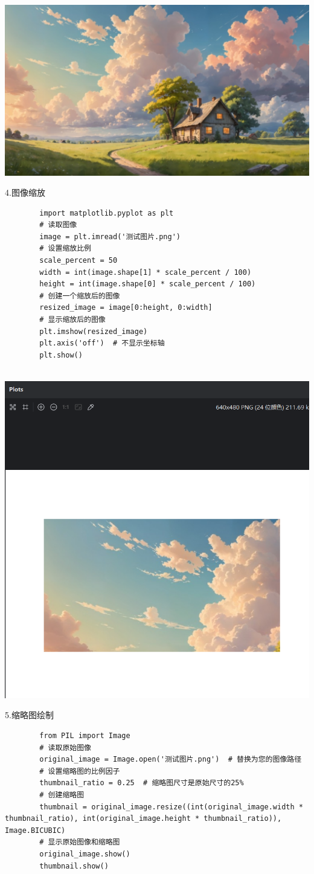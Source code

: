 \documentclass{article}
\begin{document}
	\noindent
	\begin{minipage}{\linewidth}
		\centering
		\includegraphics[width=0.5\linewidth]{mohu.png}
		\label{fig:example}
	\end{minipage}
	
	4.图像缩放
	\begin{verbatim}
		import matplotlib.pyplot as plt
		# 读取图像
		image = plt.imread('测试图片.png')
		# 设置缩放比例
		scale_percent = 50  
		width = int(image.shape[1] * scale_percent / 100)
		height = int(image.shape[0] * scale_percent / 100)
		# 创建一个缩放后的图像
		resized_image = image[0:height, 0:width]
		# 显示缩放后的图像
		plt.imshow(resized_image)
		plt.axis('off')  # 不显示坐标轴
		plt.show()
		
	\end{verbatim}
	
	\noindent
	\begin{minipage}{\linewidth}
		\centering
		\includegraphics[width=0.5\linewidth]{suofang.png}
		\label{fig:example}
	\end{minipage}
	
	5.缩略图绘制
	\begin{verbatim}
		from PIL import Image
		# 读取原始图像
		original_image = Image.open('测试图片.png')  # 替换为您的图像路径
		# 设置缩略图的比例因子
		thumbnail_ratio = 0.25  # 缩略图尺寸是原始尺寸的25%
		# 创建缩略图
		thumbnail = original_image.resize((int(original_image.width * thumbnail_ratio), int(original_image.height * thumbnail_ratio)), Image.BICUBIC)
		# 显示原始图像和缩略图
		original_image.show()
		thumbnail.show()
	\end{verbatim}
	
\end{document}

